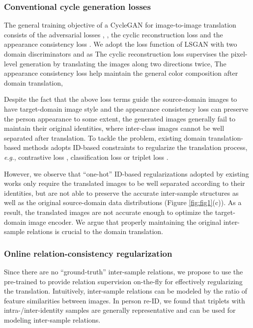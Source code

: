 \documentclass[journal]{IEEEtran}
\newcommand{\eg}{\textit{e}.\textit{g}., }
\begin{document}
\subsubsection{\textbf{Conventional cycle generation losses}}
The general training objective of a CycleGAN \cite{zhu2017unpaired} for image-to-image translation consists of the adversarial losses , , the cyclic reconstruction loss  and the appearance consistency loss . We adopt the loss function of LSGAN \cite{mao2017least} with two domain discriminators  and  as
{
}The cyclic reconstruction loss supervises the pixel-level generation by translating the images along two directions twice,
{
}The appearance consistency loss \cite{taigman2017unsupervised} help maintain the general color composition after domain translation,
{
}

Despite the fact that the above loss terms guide the source-domain images to have target-domain image style and the appearance consistency loss   can preserve the person appearance to some extent,
the generated images generally fail to maintain their original identities, where inter-class images cannot be well separated after translation.
To tackle the problem, existing domain translation-based methods adopts ID-based constraints to regularize the translation process, \eg contrastive loss \cite{deng2018image}, classification loss \cite{deng2018similarity,chen2019instance,zou2020joint} or triplet loss \cite{tang2020cgan}.

However, we observe that ``one-hot'' ID-based regularizations adopted by existing works \cite{deng2018image,wei2018person,deng2018similarity,chen2019instance,zou2020joint,tang2020cgan}  {only require the translated images to be well separated according to their identities, but} are not able to preserve the accurate inter-sample structures as well as the original source-domain data distributions (Figure \ref{fig:fig1}(c)).
As a result, the translated images are not accurate enough to optimize the target-domain image encoder.
We argue that properly maintaining the original inter-sample relations is crucial to the domain translation.


\subsubsection{\textbf{Online relation-consistency regularization}}
Since there are no ``ground-truth'' inter-sample relations,
we propose to use the pre-trained  to provide relation supervision on-the-fly for effectively regularizing the translation.
Intuitively, inter-sample relations can be modeled by the ratio of feature similarities between images.
In person re-ID, we found that triplets with intra-/inter-identity samples are generally representative and can be used for modeling inter-sample relations.
\end{document}
